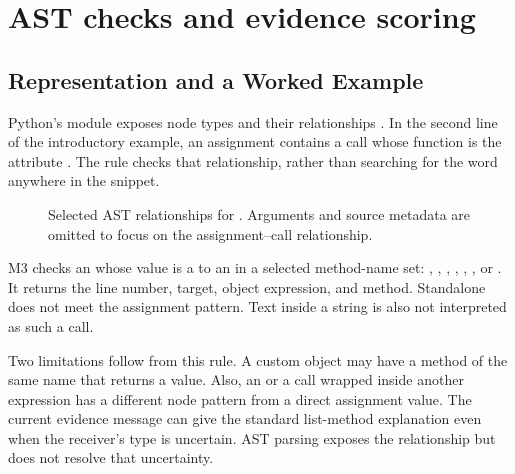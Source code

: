 \section{AST checks and evidence scoring}
\label{sec:ast}
\subsection{Representation and a Worked Example}
Python's  module exposes node types and their relationships \citep{pythonast}. In the second line of the introductory example, an assignment contains a call whose function is the attribute . The rule checks that relationship, rather than searching for the word  anywhere in the snippet.

\begin{figure}[htbp]
\centering
{}
\caption{Selected AST relationships for . Arguments and source metadata are omitted to focus on the assignment--call relationship.}
\label{fig:ast}
\end{figure}

M3 checks an  whose value is a  to an  in a selected method-name set: , , , , , , or . It returns the line number, target, object expression, and method. Standalone  does not meet the assignment pattern. Text inside a string is also not interpreted as such a call.

Two limitations follow from this rule. A custom object may have a method of the same name that returns a value. Also, an  or a call wrapped inside another expression has a different node pattern from a direct assignment value. The current evidence message can give the standard list-method explanation even when the receiver's type is uncertain. AST parsing exposes the relationship but does not resolve that uncertainty.

